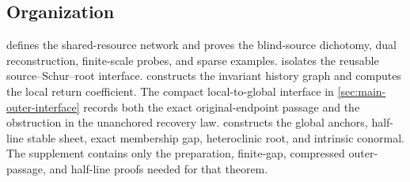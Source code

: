 \subsection{Organization}

 defines the shared-resource network and proves the
blind-source dichotomy, dual reconstruction, finite-scale probes, and sparse
examples.   isolates the reusable source--Schur--root
interface.   constructs the invariant history
graph and computes the local return coefficient.  The compact
local-to-global interface in \cref{sec:main-outer-interface} records both the
exact original-endpoint passage and the obstruction in the unanchored
recovery law.   constructs the global
anchors, half-line stable sheet, exact membership gap, heteroclinic root, and
intrinsic conormal.  The supplement contains only the preparation, finite-gap,
compressed outer-passage, and half-line proofs needed for that theorem.

